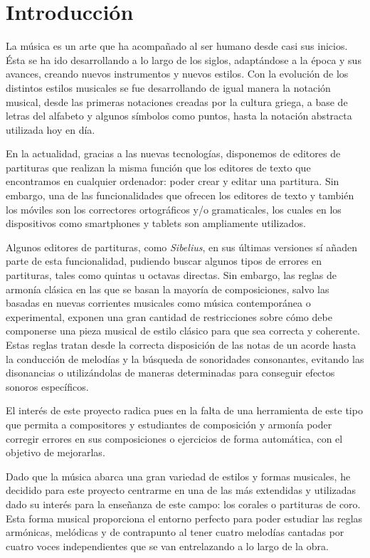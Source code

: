 \chapter*{Introducción}

La música es un arte que ha acompañado al ser humano desde casi sus inicios. Ésta se ha ido desarrollando a lo largo de los siglos, adaptándose a la época y sus avances, creando nuevos instrumentos y nuevos estilos. Con la evolución de los distintos estilos musicales se fue desarrollando de igual manera la notación musical, desde las primeras notaciones creadas por la cultura griega, a base de letras del alfabeto y algunos símbolos como puntos, hasta la notación abstracta utilizada hoy en día. 

En la actualidad, gracias a las nuevas tecnologías, disponemos de editores de partituras que realizan la misma función que los editores de texto que encontramos en cualquier ordenador: poder crear y editar una partitura. Sin embargo, una de las funcionalidades que ofrecen los editores de texto y también los móviles son los correctores ortográficos y/o gramaticales, los cuales en los dispositivos como smartphones y tablets son ampliamente utilizados. 

Algunos editores de partituras, como \textit{Sibelius}, en sus últimas versiones sí añaden parte de esta funcionalidad, pudiendo buscar algunos tipos de errores en partituras, tales como quintas u octavas directas. Sin embargo, las reglas de armonía clásica en las que se basan la mayoría de composiciones, salvo las basadas en nuevas corrientes musicales como música contemporánea o experimental, exponen una gran cantidad de restricciones sobre cómo debe componerse una pieza musical de estilo clásico para que sea correcta y coherente.  Estas reglas tratan desde la correcta disposición de las notas de un acorde hasta la conducción de melodías y la búsqueda de sonoridades consonantes, evitando las disonancias o utilizándolas de maneras determinadas para conseguir efectos sonoros específicos. 

El interés de este proyecto radica pues en la falta de una herramienta de este tipo que permita a compositores y estudiantes de composición y armonía poder corregir errores en sus composiciones o ejercicios de forma automática, con el objetivo de mejorarlas.

Dado que la música abarca una gran variedad de estilos y formas musicales, he decidido para este proyecto centrarme en una de las más extendidas y utilizadas dado su interés para la enseñanza de este campo: los corales o partituras de coro. Esta forma musical proporciona el entorno perfecto para poder estudiar las reglas armónicas, melódicas y de contrapunto al tener cuatro melodías cantadas por cuatro voces independientes que se van entrelazando a lo largo de la obra. 

